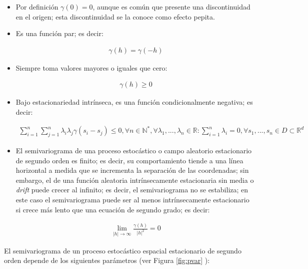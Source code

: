 \documentclass[
]{book}
\begin{document}
\begin{itemize}
\item
  Por definición \(\gamma(0)=0\), aunque es común que presente una discontinuidad en el origen; esta discontinuidad se la conoce como efecto pepita.
\item
  Es una función par; es decir:

  \begin{align}
      \gamma(h)=\gamma(-h)  
    \end{align}
\item
  Siempre toma valores mayores o iguales que cero:

  \begin{align}
      \gamma(h)\geq 0  
    \end{align}
\item
  Bajo estacionariedad intrínseca, es una función condicionalmente negativa; es decir:

  \begin{align}
      \sum_{i=1}^n \sum_{j=1}^n\lambda_i \lambda_j \gamma(s_i-s_j)\leq 0,\forall n\in \mathbb{N}^*,\forall \lambda_1,...,\lambda_n \in \mathbb{R}:\sum_{i=1}^n\lambda_i=0, \forall s_1,...,s_n \in D \subset \mathbb{R}^d  
    \end{align}
\item
  El semivariograma de una proceso estocástico o campo aleatorio estacionario de segundo orden es finito; es decir, su comportamiento tiende a una línea horizontal a medida que se incrementa la separación de las coordenadas; sin embargo, el de una función aleatoria intrínsecamente estacionaria sin media o \textit{drift} puede crecer al infinito; es decir, el semivariograma no se estabiliza; en este caso el semivariograma puede ser al menos intrínsecamente estacionario si crece más lento que una ecuación de segundo grado; es decir:

  \begin{align}
      \lim_{|h|\to \infty}\frac{\gamma(h)}{|h|^2}=0  
    \end{align}
\end{itemize}

El semivariograma de un proceso estocástico espacial estacionario de segundo orden depende de los siguientes parámetros (ver Figura \ref{fig:pvar} ):
\end{document}
